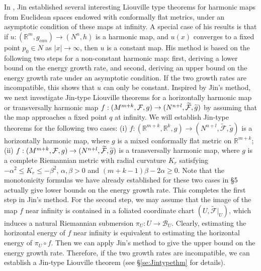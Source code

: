 \documentclass[12pt,reqno]{amsart}
\theoremstyle{definition}
\def\rr{{\mathbb R}}
\begin{document}
	In \cite{jin_liouville_nodate}, Jin established several interesting Liouville type theorems for
	harmonic maps from Euclidean spaces endowed with conformally flat metrics,
	under an asymptotic condition of these maps at infinity. A special case of
	his results is that if $u:(\rr^{m},g_{can})\rightarrow (N^{n},h)$ is a
	harmonic map, and $u(x)$ converges to a fixed point $p_{0}\in N$ as $|
	x| \rightarrow \infty $, then $u$ is a constant map. His method is based
	on the following two steps for a non-constant harmonic map: first, deriving
	a lower bound on the energy growth rate, and second, deriving an upper bound
	on the energy growth rate under an asymptotic condition. If the two growth
	rates are incompatible, this shows that $u$ can only be constant. Inspired
	by Jin's method, we next investigate Jin-type Liouville theorems for a
	horizontally harmonic map or transversally harmonic map $f:(M^{m+k},\mathcal{%
	F},g)\rightarrow (N^{n+l},\widetilde{\mathcal{F}},\widetilde{g})$ by
	assuming that the map approaches a fixed point $q$ at infinity. We will
	establish Jin-type theorems for the following two cases: (i) $f:(
	\mathbb{R}
	^{m+k},
	\mathbb{R}
	^{k},g)\rightarrow (N^{n+l},\widetilde{\mathcal{F}},\widetilde{g})$ is a
	horizontally harmonic map, where $g$ is a mixed conformally flat metric on $
	\mathbb{R}
	^{m+k}$; (ii) $f:(M^{m+k},\mathcal{F},g)\rightarrow (N^{n+l},\widetilde{%
	\mathcal{F}},\widetilde{g})$ is a transversally harmonic map, where $g$ is a
	complete Riemannian metric with radial curvature $K_{r}$ satisfying $-\alpha
	^{2}\leq K_{r}\leq -\beta ^{2}$, $\alpha ,\beta >0$ and $(m+k-1)\beta
	-2\alpha \geq 0$. Note that the monotonicity formulas we have already
	established for these two cases in \S 5 actually give lower bounds on the
	energy growth rate. This completes the first step in Jin's method. For the
	second step, we may assume that the image of the map $f$ near infinity is
	contained in a foliated coordinate chart $(U,\widetilde{\mathcal{F}}|_{U})$,
	which induces a natural Riemannian submersion $\pi _{U}:U\rightarrow 
	\mathcal{B}_{U}$. Clearly, estimating the horizontal energy of $f$ near
	infinity is equivalent to estimating the horizontal energy of $\pi _{U}\circ
	f$. Then we can apply Jin's method to give the upper bound on the energy
	growth rate. Therefore, if the two growth rates are incompatible, we can
	establish a Jin-type Liouville theorem (see \S \ref{se:Jintypethm} for details).
	
\end{document}

